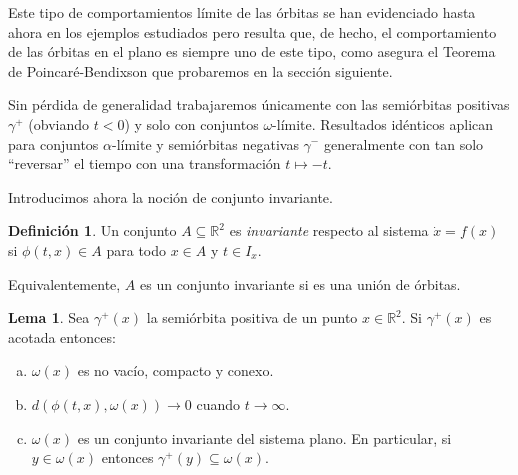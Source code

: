 \documentclass[11pt]{book}
\theoremstyle{definition}
\newtheorem{definition}{Definición}
\numberwithin{definition}{section}
\theoremstyle{theorem}
\newtheorem{lemma}{Lema}
\numberwithin{theorem}{section}
\numberwithin{lemma}{section}
\numberwithin{corollary}{section}
\theoremstyle{plain}
\numberwithin{example}{section}
\newcommand{\R}{{\ensuremath{\mathbb{R}}}}
\begin{document}
Este tipo de comportamientos límite de las órbitas se han evidenciado hasta ahora en los ejemplos estudiados pero resulta que, de hecho, el comportamiento de las órbitas en el plano es siempre uno de este tipo, como asegura el Teorema de Poincaré-Bendixson que probaremos en la sección siguiente.

Sin pérdida de generalidad trabajaremos únicamente con las semiórbitas positivas $\gamma^+$ (obviando $t < 0$) y solo con conjuntos $\omega$-límite. Resultados idénticos aplican para conjuntos $\alpha$-límite y semiórbitas negativas $\gamma^-$ generalmente con tan solo ``reversar'' el tiempo con una transformación $t \mapsto -t$.

Introducimos ahora la noción de conjunto invariante.

\begin{definition} \label{def:conjuntoinvariante}
Un conjunto $A \subseteq \R^2$ es \emph{invariante} respecto al sistema $\dot{x} = f(x)$ si $\phi(t,x) \in A$ para todo $x \in A$ y $t \in I_x$.
\end{definition}

Equivalentemente, $A$ es un conjunto invariante si es una unión de órbitas.


\begin{lemma} \label{lem:orbitaslimite}
Sea $\gamma^+(x)$ la semiórbita positiva de un punto $x \in \R^2$. Si $\gamma^+(x)$ es acotada entonces:

	\begin{enumerate}[(a)]
		\item $\omega(x)$ es no vacío, compacto y conexo.
		\item $d(\phi(t,x), \omega(x)) \to 0$ cuando $t \to \infty$.
		\item $\omega(x)$ es un conjunto invariante del sistema plano. En particular, si $y \in \omega(x)$ entonces $\gamma^+(y) \subseteq \omega(x)$.
	\end{enumerate}
\end{lemma}
\end{document}
